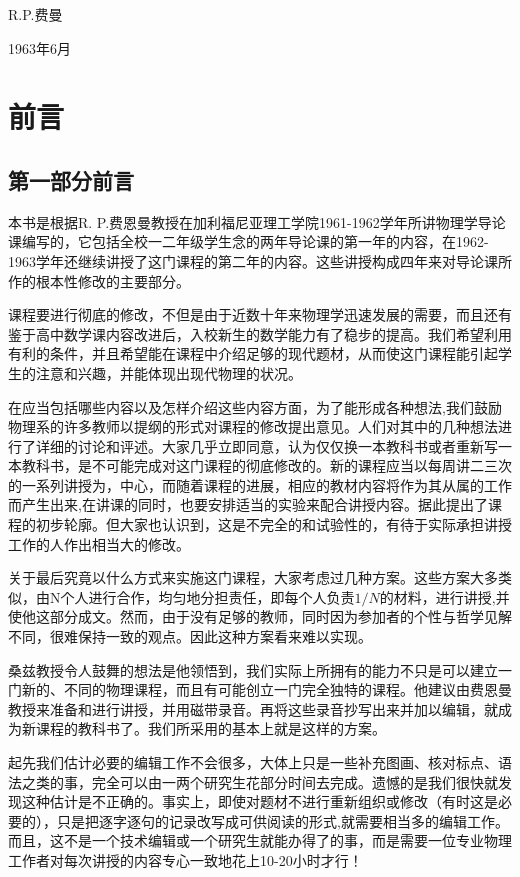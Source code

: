 \documentclass[UTF8, 12pt, a4paper, twoside]{ctexbook}
\begin{document}
\hfill R.P.费曼

\hfill 1963年6月

\chapter*{前言}

\section*{第一部分前言}

本书是根据R. P.费恩曼教授在加利福尼亚理工学院1961-1962学年所讲物理学导论课编写的，它包括全校一二年级学生念的两年导论课的第一年的内容，在1962-1963学年还继续讲授了这门课程的第二年的内容。这些讲授构成四年来对导论课所作的根本性修改的主要部分。
  
课程要进行彻底的修改，不但是由于近数十年来物理学迅速发展的需要，而且还有鉴于高中数学课内容改进后，入校新生的数学能力有了稳步的提高。我们希望利用有利的条件，并且希望能在课程中介绍足够的现代题材，从而使这门课程能引起学生的注意和兴趣，并能体现出现代物理的状况。
  
在应当包括哪些内容以及怎样介绍这些内容方面，为了能形成各种想法,我们鼓励物理系的许多教师以提纲的形式对课程的修改提出意见。人们对其中的几种想法进行了详细的讨论和评述。大家几乎立即同意，认为仅仅换一本教科书或者重新写一本教科书，是不可能完成对这门课程的彻底修改的。新的课程应当以每周讲二三次的一系列讲授为，中心，而随着课程的进展，相应的教材内容将作为其从属的工作而产生出来,在讲课的同时，也要安排适当的实验来配合讲授内容。据此提出了课程的初步轮廓。但大家也认识到，这是不完全的和试验性的，有待于实际承担讲授工作的人作出相当大的修改。
  
关于最后究竟以什么方式来实施这门课程，大家考虑过几种方案。这些方案大多类似，由N个人进行合作，均匀地分担责任，即每个人负责$1/N$的材料，进行讲授,并使他这部分成文。然而，由于没有足够的教师，同时因为参加者的个性与哲学见解不同，很难保持一致的观点。因此这种方案看来难以实现。
  
桑兹教授令人鼓舞的想法是他领悟到，我们实际上所拥有的能力不只是可以建立一门新的、不同的物理课程，而且有可能创立一门完全独特的课程。他建议由费恩曼教授来准备和进行讲授，并用磁带录音。再将这些录音抄写出来并加以编辑，就成为新课程的教科书了。我们所采用的基本上就是这样的方案。
  
起先我们估计必要的编辑工作不会很多，大体上只是一些补充图画、核对标点、语法之类的事，完全可以由一两个研究生花部分时间去完成。遗憾的是我们很快就发现这种估计是不正确的。事实上，即使对题材不进行重新组织或修改（有时这是必要的），只是把逐字逐句的记录改写成可供阅读的形式,就需要相当多的编辑工作。而且，这不是一个技术编辑或一个研究生就能办得了的事，而是需要一位专业物理工作者对每次讲授的内容专心一致地花上10-20小时才行！
  
\end{document}
